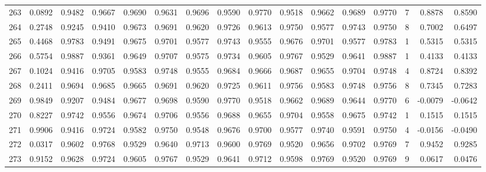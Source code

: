 \begin{tabular}{lrrrrrrrrrrrrrrr}
263 &      0.0892 &  0.9482 &  0.9667 &  0.9690 &  0.9631 &  0.9696 &  0.9590 &  0.9770 &  0.9518 &  0.9662 &   0.9689 &     0.9770 &      7 &                    0.8878 &                     0.8590 \\
264 &      0.2748 &  0.9245 &  0.9410 &  0.9673 &  0.9691 &  0.9620 &  0.9726 &  0.9613 &  0.9750 &  0.9577 &   0.9743 &     0.9750 &      8 &                    0.7002 &                     0.6497 \\
265 &      0.4468 &  0.9783 &  0.9491 &  0.9675 &  0.9701 &  0.9577 &  0.9743 &  0.9555 &  0.9676 &  0.9701 &   0.9577 &     0.9783 &      1 &                    0.5315 &                     0.5315 \\
266 &      0.5754 &  0.9887 &  0.9361 &  0.9649 &  0.9707 &  0.9575 &  0.9734 &  0.9605 &  0.9767 &  0.9529 &   0.9641 &     0.9887 &      1 &                    0.4133 &                     0.4133 \\
267 &      0.1024 &  0.9416 &  0.9705 &  0.9583 &  0.9748 &  0.9555 &  0.9684 &  0.9666 &  0.9687 &  0.9655 &   0.9704 &     0.9748 &      4 &                    0.8724 &                     0.8392 \\
268 &      0.2411 &  0.9694 &  0.9685 &  0.9665 &  0.9691 &  0.9620 &  0.9725 &  0.9611 &  0.9756 &  0.9583 &   0.9748 &     0.9756 &      8 &                    0.7345 &                     0.7283 \\
269 &      0.9849 &  0.9207 &  0.9484 &  0.9677 &  0.9698 &  0.9590 &  0.9770 &  0.9518 &  0.9662 &  0.9689 &   0.9644 &     0.9770 &      6 &                   -0.0079 &                    -0.0642 \\
270 &      0.8227 &  0.9742 &  0.9556 &  0.9674 &  0.9706 &  0.9556 &  0.9688 &  0.9655 &  0.9704 &  0.9558 &   0.9675 &     0.9742 &      1 &                    0.1515 &                     0.1515 \\
271 &      0.9906 &  0.9416 &  0.9724 &  0.9582 &  0.9750 &  0.9548 &  0.9676 &  0.9700 &  0.9577 &  0.9740 &   0.9591 &     0.9750 &      4 &                   -0.0156 &                    -0.0490 \\
272 &      0.0317 &  0.9602 &  0.9768 &  0.9529 &  0.9640 &  0.9713 &  0.9600 &  0.9769 &  0.9520 &  0.9656 &   0.9702 &     0.9769 &      7 &                    0.9452 &                     0.9285 \\
273 &      0.9152 &  0.9628 &  0.9724 &  0.9605 &  0.9767 &  0.9529 &  0.9641 &  0.9712 &  0.9598 &  0.9769 &   0.9520 &     0.9769 &      9 &                    0.0617 &                     0.0476 \\

\end{tabular}
